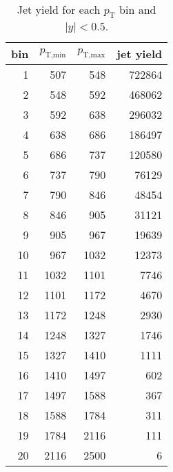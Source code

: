 
\begin{table}[htp]
  \caption{Jet yield for each $p_\textrm{T}$ bin and $|y| < 0.5$.}
  \label{tab:yield}
  \medskip
  \centering
  \begin{tabular}{|r|rr|r|}
  \hline
  bin	& $p_\textrm{T,min}$	& $p_\textrm{T,max}$	& jet yield \\ \hline
    1	&     507	&     548	&    722864	\\ \hline
   2	&     548	&     592	&    468062	\\ \hline
   3	&     592	&     638	&    296032	\\ \hline
   4	&     638	&     686	&    186497	\\ \hline
   5	&     686	&     737	&    120580	\\ \hline
   6	&     737	&     790	&     76129	\\ \hline
   7	&     790	&     846	&     48454	\\ \hline
   8	&     846	&     905	&     31121	\\ \hline
   9	&     905	&     967	&     19639	\\ \hline
  10	&     967	&    1032	&     12373	\\ \hline
  11	&    1032	&    1101	&      7746	\\ \hline
  12	&    1101	&    1172	&      4670	\\ \hline
  13	&    1172	&    1248	&      2930	\\ \hline
  14	&    1248	&    1327	&      1746	\\ \hline
  15	&    1327	&    1410	&      1111	\\ \hline
  16	&    1410	&    1497	&       602	\\ \hline
  17	&    1497	&    1588	&       367	\\ \hline
  18	&    1588	&    1784	&       311	\\ \hline
  19	&    1784	&    2116	&       111	\\ \hline
  20	&    2116	&    2500	&         6	\\ \hline
\end{tabular}
\end{table}
